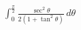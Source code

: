 \documentclass[preview]{standalone}
\begin{document}
\begin{align*}
\int_{0}^{\frac{\pi}{2}} \frac{\sec^2{\theta}}{2(1+\tan^2{\theta})} \, d\theta
\end{align*}
\end{document}
